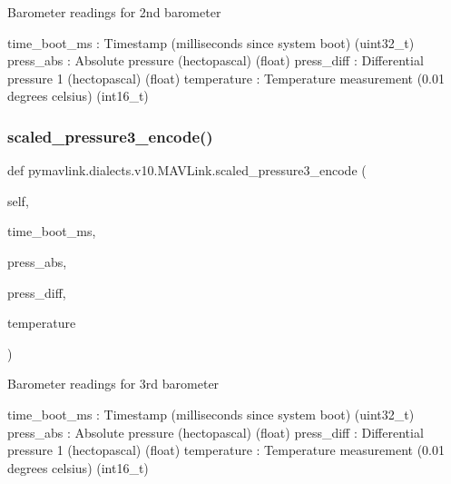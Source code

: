 \begin{DoxyVerb}
\begin{DoxyVerb}
\begin{DoxyVerb}
\begin{DoxyVerb}
\begin{DoxyVerb}
\begin{DoxyVerb}
\begin{DoxyVerb}
\begin{DoxyVerb}
\begin{DoxyVerb}
\begin{DoxyVerb}
\begin{DoxyVerb}Barometer readings for 2nd barometer

time_boot_ms              : Timestamp (milliseconds since system boot) (uint32_t)
press_abs                 : Absolute pressure (hectopascal) (float)
press_diff                : Differential pressure 1 (hectopascal) (float)
temperature               : Temperature measurement (0.01 degrees celsius) (int16_t)\end{DoxyVerb}
 \mbox{\label{classpymavlink_1_1dialects_1_1v10_1_1MAVLink_a12ff6905f51fb8be69f62f5a673a19ae}} 
\subsubsection{\texorpdfstring{scaled\+\_\+pressure3\+\_\+encode()}{scaled\_pressure3\_encode()}}
{\footnotesize\ttfamily def pymavlink.\+dialects.\+v10.\+M\+A\+V\+Link.\+scaled\+\_\+pressure3\+\_\+encode (\begin{DoxyParamCaption}\item[{}]{self,  }\item[{}]{time\+\_\+boot\+\_\+ms,  }\item[{}]{press\+\_\+abs,  }\item[{}]{press\+\_\+diff,  }\item[{}]{temperature }\end{DoxyParamCaption})}

\begin{DoxyVerb}Barometer readings for 3rd barometer

time_boot_ms              : Timestamp (milliseconds since system boot) (uint32_t)
press_abs                 : Absolute pressure (hectopascal) (float)
press_diff                : Differential pressure 1 (hectopascal) (float)
temperature               : Temperature measurement (0.01 degrees celsius) (int16_t)\end{DoxyVerb}
 \mbox{\label{classpymavlink_1_1dialects_1_1v10_1_1MAVLink_a3225152a125ae8e3eb88fbec5c0f6024}} 

\end{DoxyVerb}
\end{DoxyVerb}
\end{DoxyVerb}
\end{DoxyVerb}
\end{DoxyVerb}
\end{DoxyVerb}
\end{DoxyVerb}
\end{DoxyVerb}
\end{DoxyVerb}
\end{DoxyVerb}
